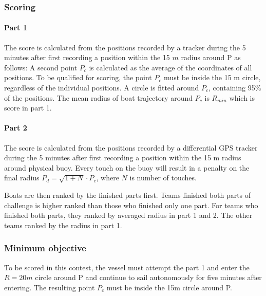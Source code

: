 \documentclass[12pt]{article}
\begin{document}
\subsubsection{Scoring}

\paragraph{Part 1}

The score is calculated from the positions recorded by a tracker during the 5
minutes after first recording a position within the 15 $m$ radius around P as
follows:
A second point $P_c$ is calculated as the average of the coordinates of all
positions. To be qualified for scoring, the point $P_c$ must be
inside the 15 m circle, regardless of the individual positions.
A circle is fitted around $P_c$, containing 95\% of the positions.
The mean radius of boat trajectory around $P_c$ is $R_{min}$ which is score in part 1.

\paragraph{Part 2}
The score is calculated from the positions recorded by a differential GPS tracker during the 5
minutes after first recording a position within the 15 m radius around physical buoy.
Every touch on the buoy will result in a penalty on the final radius $P_d = \sqrt{1+N}\cdot P_c$,
where $N$ is number of touches. 

Boats are then ranked by the finished parts first. 
Teams finished both parts of challenge is higher ranked than those who finished only one part.
For teams who finished both parts, they ranked by averaged radius in part 1 and 2.
The other teams ranked by the radius in part 1.


\subsubsection{Minimum objective}
To be scored in this contest, the vessel must attempt the part 1 and enter the $R=20m$ circle around P
and continue to sail autonomously for five minutes after entering. The resulting 
point $P_c$ must be inside the 15m circle around P.
\end{document}
